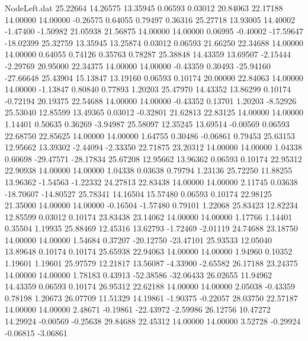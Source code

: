 \begin{filecontents}{NodeLeft.dat}
  25.22664   14.26575   13.35945     0.06593    0.03012   20.84063   22.17188   14.00000   14.00000   -0.26575    0.64055    0.79497    0.36316
  25.27718   13.93005   14.40002    -1.47400   -1.50982   21.05938   21.56875   14.00000   14.00000    0.06995   -0.40002  -17.59647  -18.02399
  25.32759   13.35945   13.25874     0.03012    0.06593   21.66250   22.34688   14.00000   14.00000    0.64055    0.74126    0.35763    0.78287
  25.38848   14.43359   13.69507    -2.15444   -2.29769   20.95000   22.34375   14.00000   14.00000   -0.43359    0.30493  -25.94160  -27.66648
  25.43904   15.13847   13.19160     0.06593    0.10174   20.00000   22.84063   14.00000   14.00000   -1.13847    0.80840    0.77893    1.20203
  25.47970   14.43352   13.86299     0.10174   -0.72194   20.19375   22.54688   14.00000   14.00000   -0.43352    0.13701    1.20203   -8.52926
  25.53040   12.85599   13.49365     0.03012   -0.32801   21.62813   22.83125   14.00000   14.00000    1.14401    0.50635    0.36269   -3.94987
  25.58097   12.35245   13.69514    -0.00569    0.06593   22.68750   22.85625   14.00000   14.00000    1.64755    0.30486   -0.06861    0.79453
  25.63153   12.95662   13.39302    -2.44094   -2.33350   22.71875   23.20312   14.00000   14.00000    1.04338    0.60698  -29.47571  -28.17834
  25.67208   12.95662   13.96362     0.06593    0.10174   22.95312   22.90938   14.00000   14.00000    1.04338    0.03638    0.79794    1.23136
  25.72250   11.88255   13.96362    -1.54563   -1.22332   24.27813   22.83438   14.00000   14.00000    2.11745    0.03638  -18.70607  -14.80527
  25.78341   14.16504   15.57480     0.06593    0.10174   22.98125   21.35000   14.00000   14.00000   -0.16504   -1.57480    0.79101    1.22068
  25.83423   12.82234   12.85599     0.03012    0.10174   23.83438   23.14062   14.00000   14.00000    1.17766    1.14401    0.35504    1.19935
  25.88469   12.45316   13.62793    -1.72469   -2.01119   24.74688   23.18750   14.00000   14.00000    1.54684    0.37207  -20.12750  -23.47101
  25.93533   12.05040   13.89648     0.10174    0.10174   25.65938   22.94063   14.00000   14.00000    1.94960    0.10352    1.19601    1.19601
  25.97579   12.21817   13.56087    -4.33900   -2.65582   26.17188   23.24375   14.00000   14.00000    1.78183    0.43913  -52.38586  -32.06433
  26.02655   11.94962   14.43359     0.06593    0.10174   26.95312   22.62188   14.00000   14.00000    2.05038   -0.43359    0.78198    1.20673
  26.07709   11.51329   14.19861    -1.90375   -0.22057   28.03750   22.57187   14.00000   14.00000    2.48671   -0.19861  -22.43972   -2.59986
  26.12756   10.47272   14.29924    -0.00569   -0.25638   29.84688   22.45312   14.00000   14.00000    3.52728   -0.29924   -0.06815   -3.06861

\end{filecontents}
